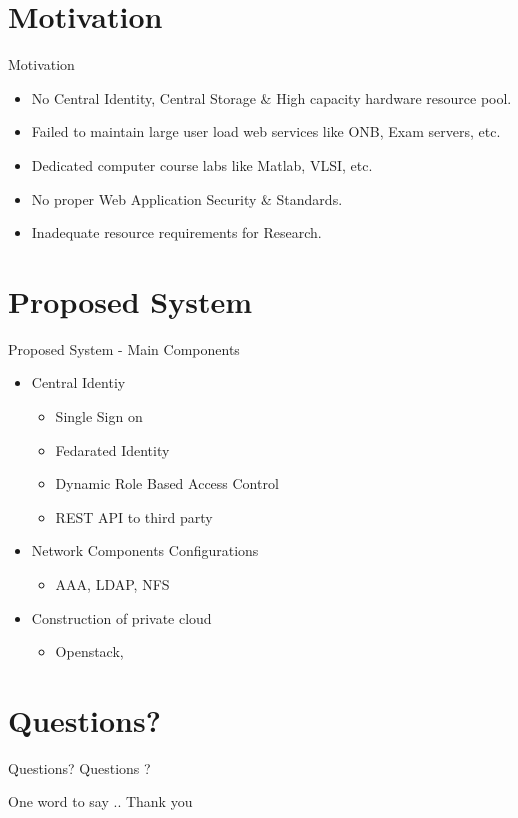 \documentclass[xcolor=dvipsnames]{beamer}
\begin{document}
\section{Motivation}
\begin{frame}{Motivation}

\begin{itemize}
	\item No Central Identity, Central Storage \& High capacity hardware resource pool.
	\item Failed to maintain large user load web services like ONB, Exam servers, etc.
	\item Dedicated computer course labs like Matlab, VLSI, etc.
	\item No proper Web Application Security \& Standards.
	\item Inadequate resource requirements for Research.
\end{itemize}

\end{frame}



\section{Proposed System}
\begin{frame}{Proposed System -  Main Components}
\begin{itemize}
	\item Central Identiy 
	\begin{itemize}
		\item Single Sign on
		\item Fedarated Identity
		\item Dynamic Role Based Access Control
		\item REST API to third party
	\end{itemize}
	\item Network Components Configurations
	\begin{itemize}
		\item AAA, LDAP, NFS
	\end{itemize}
	\item Construction of private cloud
	\begin{itemize}
		\item Openstack, 
	\end{itemize}
\end{itemize}
\end{frame}


\section{Questions?}
\begin{frame}{Questions?}
\centering
Questions ?
\end{frame}


\begin{frame}{One word to say ..}
Thank you
\end{frame}
\end{document}
